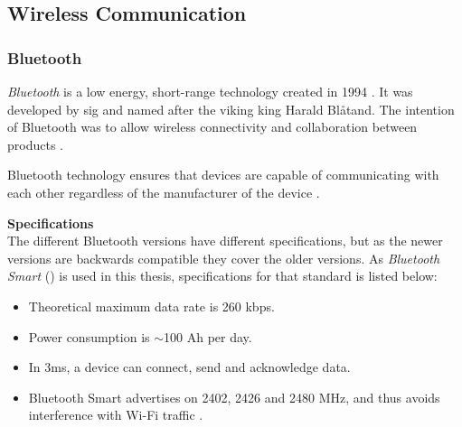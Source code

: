 \subsection{Wireless Communication}
\subsubsection{Bluetooth}
\textit{Bluetooth} is a low energy, short-range technology created in 1994 \cite{ble2016}. It was developed by \acrshort{sig} and named after the viking king Harald Blåtand. The intention of Bluetooth was to allow wireless connectivity and collaboration between products \cite{bluetoothsig2016}.

Bluetooth technology ensures that devices are capable of communicating with each other regardless of the manufacturer of the device \cite{prabhu2004}.  

\textbf{Specifications}
\\
The different Bluetooth versions have different specifications, but as the newer versions are backwards compatible \cite{bluetoothreport2013} they cover the older versions. As \textit{Bluetooth Smart} () is used in this thesis, specifications for that standard is listed below:

\begin{itemize}
    \item Theoretical maximum data rate is 260 kbps.
    \item Power consumption is $\sim$100 \micro Ah per day.
    \item In 3ms, a device can connect, send and acknowledge data.
    \item Bluetooth Smart advertises on 2402, 2426 and 2480 MHz, and thus avoids interference with Wi-Fi traffic \cite{csr2010}.
\end{itemize}